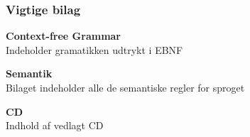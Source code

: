 \subsubsection*{Vigtige bilag}
\begin{itemize_small}
    \item \textbf{Context-free Grammar}\\
    Indeholder gramatikken udtrykt i EBNF
    \item \textbf{Semantik}\\
    Bilaget indeholder alle de semantiske regler for sproget
    \item \textbf{CD}\\
    Indhold af vedlagt CD
\end{itemize_small}

